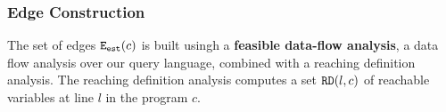 
  
\subsubsection{Edge Construction}
\label{sec:alg_edgegen}
The set of edges $\mathtt{{E_{est}}}(c)$ is built usingh a \textbf{feasible data-flow analysis}, 
a data flow analysis over 
our query language, combined with a reaching definition analysis.
The reaching definition analysis computes a set $\mathtt{RD}(l, c)$ of reachable 
variables at line $l$ in the program $c$.


